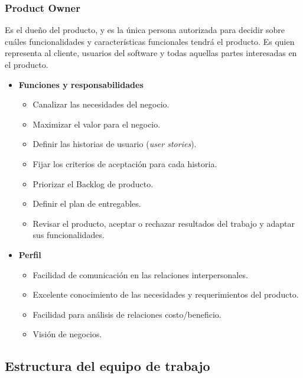         \subsubsection{Product Owner}
        Es el dueño del producto, y es la única persona autorizada para decidir sobre cuáles funcionalidades y características funcionales tendrá el producto.
        Es quien representa al cliente, usuarios del software y todas aquellas partes interesadas en el producto.
        	\begin{itemize}
			\item \textbf{Funciones y responsabilidades}
            	\begin{itemize}
				\item Canalizar las necesidades del negocio.
                \item Maximizar el valor para el negocio.
                \item Definir las historias de usuario (\textit{user stories}).
                \item Fijar los criterios de aceptación para cada historia.
                \item Priorizar el Backlog de producto.
                \item Definir el plan de entregables.
                \item Revisar el producto, aceptar o rechazar resultados del trabajo y adaptar sus funcionalidades.
				\end{itemize}
             
            \item \textbf{Perfil}
            	\begin{itemize}
				\item Facilidad de comunicación en las relaciones interpersonales.
                \item Excelente conocimiento de las necesidades y requerimientos del producto.
                \item Facilidad para análisis de relaciones costo/beneficio.
                \item Visión de negocios.
				\end{itemize}
                
			\end{itemize}



\subsection{Estructura del equipo de trabajo}

